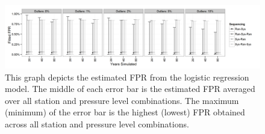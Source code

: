 \documentclass[12pt]{article}
\begin{document}
\begin{figure}[h!]
	\centering
	\includegraphics[width=\textwidth]{FPR_Order_Plot_BW}
	\caption{This graph depicts the estimated FPR from the logistic regression model.  The middle of each error bar is the estimated FPR averaged over all station and pressure level combinations.  The maximum (minimum) of the error bar is the highest (lowest) FPR obtained across all station and pressure level combinations.}
	\label{fig:fitFPR}
\end{figure}
\end{document}
